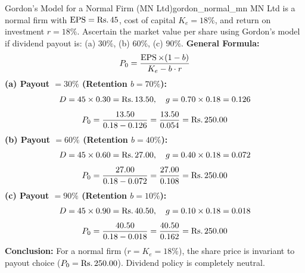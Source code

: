 \begin{example}{Gordon's Model for a Normal Firm (MN Ltd)}{gordon_normal_mn}
MN Ltd is a normal firm with $\operatorname{EPS} = \text{Rs.}\, 45$, cost of capital $K_e = 18\%$, and return on investment $r = 18\%$. Ascertain the market value per share using Gordon's model if dividend payout is: (a) $30\%$, (b) $60\%$, (c) $90\%$.
\tcblower
\textbf{General Formula:}
\begin{equation*}
    P_0 = \frac{\operatorname{EPS} \times (1 - b)}{K_e - b \cdot r}
\end{equation*}
\textbf{(a) Payout $= 30\%$ (Retention $b = 70\%$):}
\begin{equation*}
    D = 45 \times 0.30 = \text{Rs.}\, 13.50, \quad g = 0.70 \times 0.18 = 0.126
\end{equation*}
\begin{equation*}
    P_0 = \frac{13.50}{0.18 - 0.126} = \frac{13.50}{0.054} = \text{Rs.}\, 250.00
\end{equation*}
\textbf{(b) Payout $= 60\%$ (Retention $b = 40\%$):}
\begin{equation*}
    D = 45 \times 0.60 = \text{Rs.}\, 27.00, \quad g = 0.40 \times 0.18 = 0.072
\end{equation*}
\begin{equation*}
    P_0 = \frac{27.00}{0.18 - 0.072} = \frac{27.00}{0.108} = \text{Rs.}\, 250.00
\end{equation*}
\textbf{(c) Payout $= 90\%$ (Retention $b = 10\%$):}
\begin{equation*}
    D = 45 \times 0.90 = \text{Rs.}\, 40.50, \quad g = 0.10 \times 0.18 = 0.018
\end{equation*}
\begin{equation*}
    P_0 = \frac{40.50}{0.18 - 0.018} = \frac{40.50}{0.162} = \text{Rs.}\, 250.00
\end{equation*}
\textbf{Conclusion:} For a normal firm ($r = K_e = 18\%$), the share price is invariant to payout choice ($P_0 = \text{Rs.}\, 250.00$). Dividend policy is completely neutral.
\end{example}

